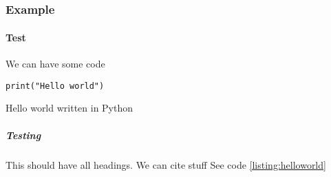 \documentclass{uniarticle}
\begin{document}
\begin{figure}[h]
    \caption{}
    \label{fig:}
\end{figure}

\subsection{}
\subsubsection{Example}

\paragraph{Test}

We can have some code

\begin{listing}
    \begin{verbatim}
print("Hello world")
    \end{verbatim}
    \caption{Hello world written in Python}
    \label{listing:helloworld}
\end{listing}

\subparagraph{Testing}

This should have all headings. We can cite stuff \cite{harris_array_2020}
See code \cref{listing:helloworld}


\end{document}
